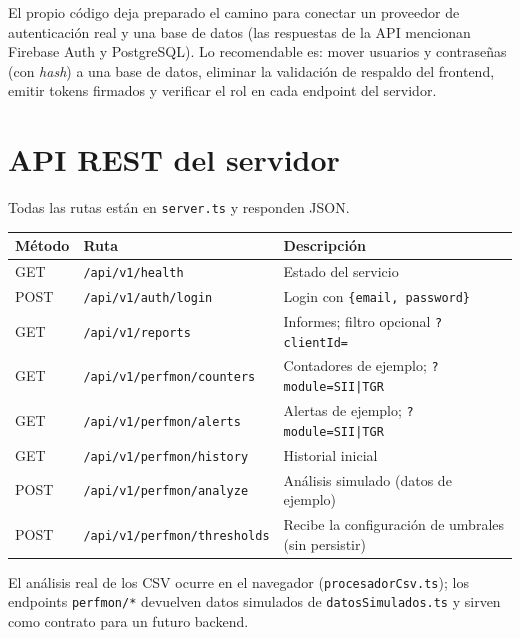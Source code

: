 \documentclass[11pt,a4paper]{article}
\newcommand{\ruta}[1]{\texttt{#1}}
\begin{document}
\begin{nota}
El propio código deja preparado el camino para conectar un proveedor de autenticación
real y una base de datos (las respuestas de la API mencionan Firebase Auth y
PostgreSQL). Lo recomendable es: mover usuarios y contraseñas (con \emph{hash}) a una
base de datos, eliminar la validación de respaldo del frontend, emitir tokens firmados y
verificar el rol en cada endpoint del servidor.
\end{nota}

\section{API REST del servidor}

Todas las rutas están en \ruta{server.ts} y responden JSON.

\begin{center}
\begin{tabularx}{\linewidth}{llX}
\toprule
\textbf{Método} & \textbf{Ruta} & \textbf{Descripción} \\
\midrule
GET  & \texttt{/api/v1/health}            & Estado del servicio \\
POST & \texttt{/api/v1/auth/login}        & Login con \texttt{\{email, password\}} \\
GET  & \texttt{/api/v1/reports}           & Informes; filtro opcional \texttt{?clientId=} \\
GET  & \texttt{/api/v1/perfmon/counters}  & Contadores de ejemplo; \texttt{?module=SII|TGR} \\
GET  & \texttt{/api/v1/perfmon/alerts}    & Alertas de ejemplo; \texttt{?module=SII|TGR} \\
GET  & \texttt{/api/v1/perfmon/history}   & Historial inicial \\
POST & \texttt{/api/v1/perfmon/analyze}   & Análisis simulado (datos de ejemplo) \\
POST & \texttt{/api/v1/perfmon/thresholds}& Recibe la configuración de umbrales (sin persistir) \\
\bottomrule
\end{tabularx}
\end{center}

\begin{nota}
El análisis real de los CSV ocurre en el navegador
(\ruta{procesadorCsv.ts}); los endpoints \texttt{perfmon/*} devuelven datos simulados de
\ruta{datosSimulados.ts} y sirven como contrato para un futuro backend.
\end{nota}
\end{document}

